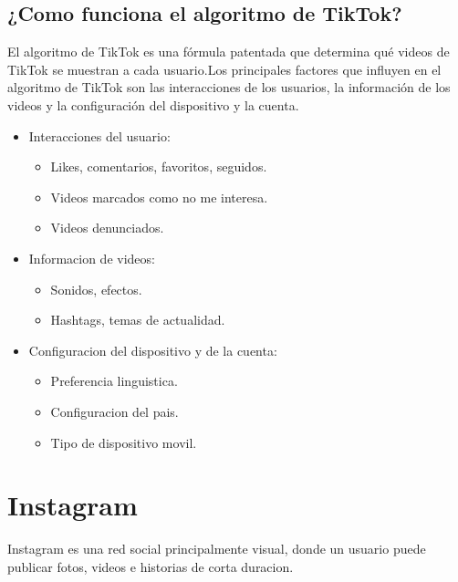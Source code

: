 \subsection*{¿Como funciona el algoritmo de TikTok?}
El algoritmo de TikTok es una fórmula patentada que determina qué videos de TikTok se muestran a cada usuario.Los principales factores que influyen en el algoritmo de TikTok son las interacciones de los usuarios, la información de los videos y la configuración del dispositivo y la cuenta.
\begin{itemize}
    \item Interacciones del usuario:
        \begin{itemize}
            \item Likes, comentarios, favoritos, seguidos.
            \item Videos marcados como no me interesa.
            \item Videos denunciados.
        \end{itemize}
    \item Informacion de videos:
        \begin{itemize}
            \item Sonidos, efectos.
            \item Hashtags, temas de actualidad.
        \end{itemize}
    \item Configuracion del dispositivo y de la cuenta:
        \begin{itemize}
            \item Preferencia linguistica.
            \item Configuracion del pais.
            \item Tipo de dispositivo movil.
        \end{itemize}
\end{itemize}
   
\section{{\textbf{Instagram}}}
Instagram es una red social principalmente visual, donde un usuario puede publicar fotos, videos e historias de corta duracion.
